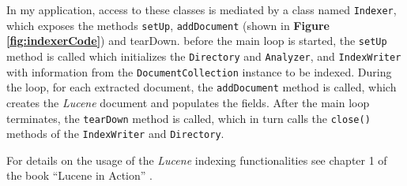 \documentclass[a4paper]{usiinfbachelorproject}
\begin{document}
In my application, access to these classes is mediated by a class named \texttt{Indexer}, which exposes the methods
\texttt{setUp}, \texttt{addDocument} (shown in \textbf{Figure \ref{fig:indexerCode}})
 and tearDown. before the main loop is started, the \texttt{setUp} method is called which
initializes the \texttt{Directory} and \texttt{Analyzer}, and \texttt{IndexWriter} with information from
the \texttt{DocumentCollection} instance to be indexed. During the loop, for each extracted document, the
\texttt{addDocument} method is called, which creates the \emph{Lucene} document and populates the fields.
After the main loop terminates, the \texttt{tearDown} method is called, which
in turn calls the \texttt{close()} methods of the \texttt{IndexWriter} and \texttt{Directory}.

For details on the usage of the \emph{Lucene} indexing functionalities see chapter 1 of the book
``Lucene in Action'' \cite{luceneInAction}.
\end{document}
